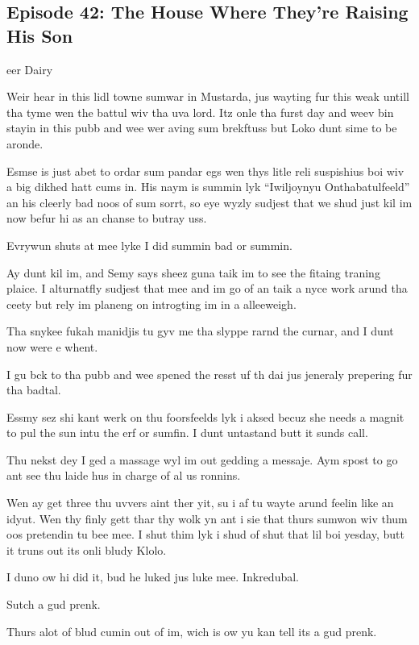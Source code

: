 \subsection{Episode 42: The House Where They're Raising His Son}

eer Dairy\medskip

Weir hear in this lidl towne sumwar in Mustarda, jus wayting fur this weak untill tha tyme wen the battul wiv tha uva lord. Itz onle tha furst day and weev bin stayin in this pubb and wee wer aving sum brekftuss but Loko dunt sime to be aronde.\medskip

Esmse is just abet to ordar sum pandar egs wen thys litle reli suspishius boi wiv a big dikhed hatt cums in. His naym is summin lyk ``Iwiljoynyu Onthabatulfeeld'' an his cleerly bad noos of sum sorrt, so eye wyzly sudjest that we shud just kil im now befur hi as an chanse to butray uss.\medskip

Evrywun shuts at mee lyke I did summin bad or summin.\medskip

Ay dunt kil im, and Semy says sheez guna taik im to see the fitaing traning plaice. I alturnatfly sudjest that mee and im go of an taik a nyce work arund tha ceety but rely im planeng on introgting im in a alleeweigh.\medskip

Tha snykee fukah manidjis tu gyv me tha slyppe rarnd the curnar, and I dunt now were e whent.\medskip

I gu bck to tha pubb and wee spened the resst uf th dai jus jeneraly prepering fur tha badtal.\medskip

Essmy sez shi kant werk on thu foorsfeelds lyk i aksed becuz she needs a magnit to pul the sun intu the erf or sumfin. I dunt untastand butt it sunds call.\medskip

Thu nekst dey I ged a massage wyl im out gedding a messaje. Aym spost to go ant see thu laide hus in charge of al us ronnins.\medskip

Wen ay get three thu uvvers aint ther yit, su i af tu wayte arund feelin like an idyut. Wen thy finly gett thar thy wolk yn ant i sie that thurs sumwon wiv thum oos pretendin tu bee mee. I shut thim lyk i shud of shut that lil boi yesday, butt it truns out its onli bludy Klolo.\medskip

I duno ow hi did it, bud he luked jus luke mee. Inkredubal.\medskip

Sutch a gud prenk.\medskip

Thurs alot of blud cumin out of im, wich is ow yu kan tell its a gud prenk.\medskip

